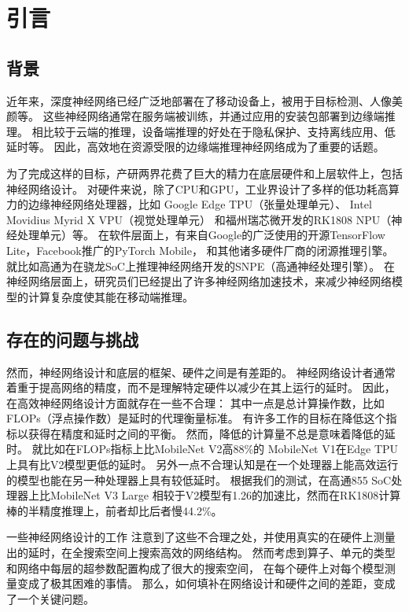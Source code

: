 \section{引言}
\subsection{背景}
近年来，深度神经网络已经广泛地部署在了移动设备上，被用于目标检测、人像美颜等。
这些神经网络通常在服务端被训练，并通过应用的安装包部署到边缘端推理。
相比较于云端的推理，设备端推理的好处在于隐私保护、支持离线应用、低延时等。
因此，高效地在资源受限的边缘端推理神经网络成为了重要的话题。

为了完成这样的目标，产研两界花费了巨大的精力在底层硬件和上层软件上，包括神经网络设计。
对硬件来说，除了CPU和GPU，工业界设计了多样的低功耗高算力的边缘神经网络处理器，比如
Google Edge TPU（张量处理单元）\cite{edgetpu}、
Intel Movidius Myrid X VPU（视觉处理单元）\cite{myriad}
和福州瑞芯微开发的RK1808 NPU（神经处理单元）\cite{rk3399pro}等。
在软件层面上，有来自Google的广泛使用的开源TensorFlow Lite，Facebook推广的PyTorch Mobile，
和其他诸多硬件厂商的闭源推理引擎。
就比如高通为在骁龙SoC上推理神经网络开发的SNPE（高通神经处理引擎）\cite{snpe}。
在神经网络层面上，研究员们已经提出了许多神经网络加速技术，来减少神经网络模型的计算复杂度使其能在移动端推理。

\subsection{存在的问题与挑战}
然而，神经网络设计和底层的框架、硬件之间是有差距的。
神经网络设计者通常着重于提高网络的精度，而不是理解特定硬件以减少在其上运行的延时。
因此，在高效神经网络设计方面就存在一些不合理：
其中一点是总计算操作数，比如FLOPs（浮点操作数）是延时的代理衡量标准。
有许多工作的目标在降低这个指标以获得在精度和延时之间的平衡。
然而，降低的计算量不总是意味着降低的延时。
就比如在FLOPs指标上比MobileNet V2\cite{sandler2018mobilenetv2}高88\%的
MobileNet V1\cite{howard2017mobilenets}在Edge TPU上具有比V2模型更低的延时。
另外一点不合理认知是在一个处理器上能高效运行的模型也能在另一种处理器上具有较低延时。
根据我们的测试，在高通855 SoC处理器上比MobileNet V3 Large\cite{howard2019searching}
相较于V2模型有1.26的加速比，然而在RK1808计算棒的半精度推理上，前者却比后者慢44.2\%。

一些神经网络设计的工作\cite{tan2019mnasnet,dai2019chamnet,yang2018netadapt}
注意到了这些不合理之处，并使用真实的在硬件上测量出的延时，在全搜索空间上搜索高效的网络结构。
然而考虑到算子、单元的类型和网络中每层的超参数配置构成了很大的搜索空间，
在每个硬件上对每个模型测量变成了极其困难的事情。
那么，如何填补在网络设计和硬件之间的差距，变成了一个关键问题。

